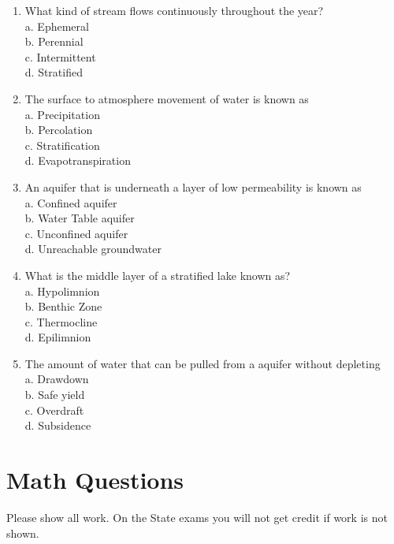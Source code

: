 \documentclass[10pt]{article}
\begin{document}
\begin{enumerate}
  \item What kind of stream flows continuously throughout the year?\\
a. Ephemeral\\
b. Perennial\\
c. Intermittent\\
d. Stratified

  \item The surface to atmosphere movement of water is known as\\
a. Precipitation\\
b. Percolation\\
c. Stratification\\
d. Evapotranspiration

  \item An aquifer that is underneath a layer of low permeability is known as\\
a. Confined aquifer\\
b. Water Table aquifer\\
c. Unconfined aquifer\\
d. Unreachable groundwater

  \item What is the middle layer of a stratified lake known as?\\
a. Hypolimnion\\
b. Benthic Zone\\
c. Thermocline\\
d. Epilimnion

  \item The amount of water that can be pulled from a aquifer without depleting\\
a. Drawdown\\
b. Safe yield\\
c. Overdraft\\
d. Subsidence

\end{enumerate}
\section{Math Questions}
Please show all work. On the State exams you will not get credit if work is not shown.
\end{document}
